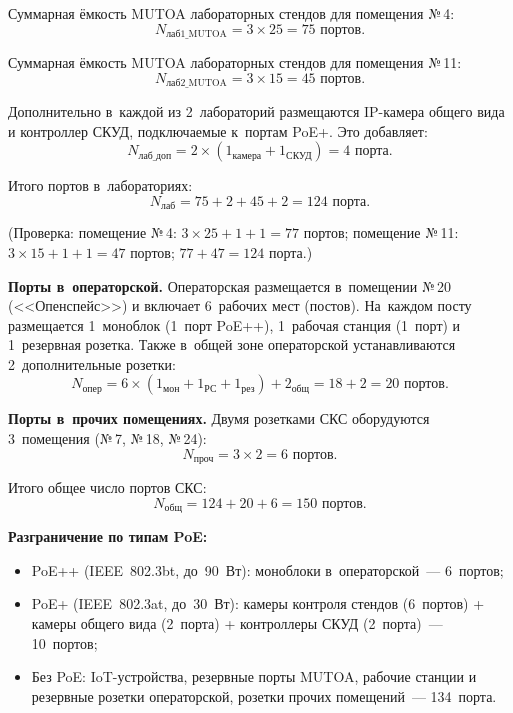 \documentclass[a4paper,oneside,14pt]{extreport}
\begin{document}
Суммарная ёмкость MUTOA лабораторных стендов для помещения №\,4:
\begin{equation}
    N_{\text{лаб1\_MUTOA}} = 3 \times 25 = 75 \text{ портов}.
\end{equation}

Суммарная ёмкость MUTOA лабораторных стендов для помещения №\,11:
\begin{equation}
    N_{\text{лаб2\_MUTOA}} = 3 \times 15 = 45 \text{ портов}.
\end{equation}

Дополнительно в~каждой из 2~лабораторий размещаются IP-камера общего вида и контроллер СКУД, подключаемые к~портам PoE+. Это добавляет:
\begin{equation}
    N_{\text{лаб\_доп}} = 2 \times (1_{\text{камера}} + 1_{\text{СКУД}}) = 4 \text{ порта}.
\end{equation}

Итого портов в~лабораториях:
\begin{equation}
    N_{\text{лаб}} = 75 + 2 + 45 + 2 = 124 \text{ порта}.
\end{equation}

(Проверка: помещение №\,4: $3 \times 25 + 1 + 1 = 77$ портов; помещение №\,11: $3 \times 15 + 1 + 1 = 47$ портов; $77 + 47 = 124$ порта.)

\textbf{Порты в~операторской.} Операторская размещается в~помещении №\,20 (<<Опенспейс>>) и включает 6~рабочих мест (постов). На~каждом посту размещается 1~моноблок (1~порт PoE++), 1~рабочая станция (1~порт) и 1~резервная розетка. Также в~общей зоне операторской устанавливаются 2~дополнительные розетки:
\begin{equation}
    N_{\text{опер}} = 6 \times (1_{\text{мон}} + 1_{\text{РС}} + 1_{\text{рез}}) + 2_{\text{общ}} = 18 + 2 = 20 \text{ портов}.
    \label{eq:n_oper}
\end{equation}

\textbf{Порты в~прочих помещениях.} Двумя розетками СКС оборудуются 3~помещения (№\,7, №\,18, №\,24):
\begin{equation}
    N_{\text{проч}} = 3 \times 2 = 6 \text{ портов}.
    \label{eq:n_other}
\end{equation}

Итого общее число портов СКС:
\begin{equation}
    N_{\text{общ}} = 124 + 20 + 6 = 150 \text{ портов}.
    \label{eq:n_total_calc}
\end{equation}

\textbf{Разграничение по типам PoE:}
\begin{itemize}
    \item PoE++ (IEEE~802.3bt, до~90~Вт): моноблоки в~операторской~--- 6~портов;
    \item PoE+ (IEEE~802.3at, до~30~Вт): камеры контроля стендов (6~портов) + камеры общего вида (2~порта) + контроллеры СКУД (2~порта)~--- 10~портов;
    \item Без PoE: IoT-устройства, резервные порты MUTOA, рабочие станции и резервные розетки операторской, розетки прочих помещений~--- 134~порта.
\end{itemize}
\end{document}

